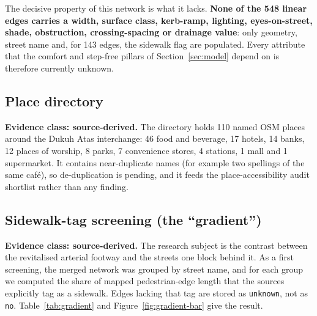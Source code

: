 \documentclass[11pt,a4paper]{article}
\newcommand{\evclass}[2]{\noindent\textcolor{#1}{\small\textbf{Evidence class: #2.}}\enspace}
\begin{document}
The decisive property of this network is what it lacks. \textbf{None of the 548 linear edges carries a
width, surface class, kerb-ramp, lighting, eyes-on-street, shade, obstruction, crossing-spacing or
drainage value}: only geometry, street name and, for 143 edges, the sidewalk flag are populated. Every
attribute that the comfort and step-free pillars of Section~\ref{sec:model} depend on is therefore
currently unknown.

\subsection{Place directory}

\evclass{pijakamber}{source-derived}
The directory holds 110 named OSM places around the Dukuh Atas interchange: 46 food and beverage,
17 hotels, 14 banks, 12 places of worship, 8 parks, 7 convenience stores, 4 stations, 1 mall and
1 supermarket. It contains near-duplicate names (for example two spellings of the same
caf\'e), so de-duplication is pending, and it feeds the place-accessibility audit shortlist rather than
any finding.

\subsection{Sidewalk-tag screening (the ``gradient'')}\label{sec:gradient}

\evclass{pijakamber}{source-derived}
The research subject is the contrast between the revitalised arterial footway and the streets one
block behind it. As a first screening, the merged network was grouped by street name, and for each
group we computed the share of mapped pedestrian-edge length that the sources explicitly tag as a
sidewalk. Edges lacking that tag are stored as \texttt{unknown}, not as \texttt{no}.
Table~\ref{tab:gradient} and Figure~\ref{fig:gradient-bar} give the result.
\end{document}
